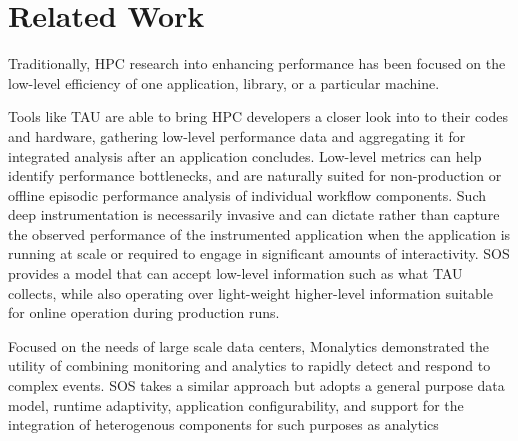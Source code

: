 
\section{Related Work}
%
Traditionally, HPC research into enhancing performance has been
focused on the low-level efficiency of one application, library, or
a particular machine.
%
%
\par
%
Tools like TAU \cite{huck2006taug} are able to bring HPC developers a
closer look into to their codes and hardware, gathering low-level
performance data and aggregating it for integrated analysis after an
application concludes.
%
Low-level metrics can help identify performance bottlenecks, and are
naturally suited for non-production or offline episodic performance
analysis of individual workflow components.
%
Such deep instrumentation is necessarily invasive and can dictate
rather than capture the observed performance of the instrumented
application when the application is running at scale or required to
engage in significant amounts of interactivity.
%
SOS provides a model that can accept low-level information such as
what TAU collects, while also operating over light-weight higher-level
information suitable for online operation during production runs.
%
\par
%
%
%
Focused on the needs of large scale data centers, Monalytics
\cite{kutare2010monalytics} demonstrated the utility of
combining monitoring and analytics to rapidly detect and respond to
complex events.
%
SOS takes a similar approach but adopts a general purpose data model,
runtime adaptivity, application configurability, and support for the
integration of heterogenous components for such purposes as analytics
